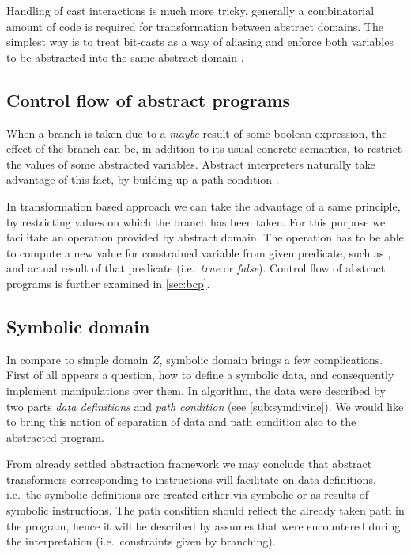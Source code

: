 Handling of cast interactions is much more tricky, generally a combinatorial
amount of code is required for transformation between abstract domains. The
simplest way is to treat bit-casts as a way of aliasing and enforce both
variables to be abstracted into the same abstract domain \cite{Rockai15}.


\subsection{Control flow of abstract programs} \label{subsec:cf}
When a branch is taken due to a \emph{maybe} result of some boolean expression,
the effect of the branch can be, in addition to its usual concrete semantics,
to restrict the values of some abstracted variables. Abstract interpreters
naturally take advantage of this fact, by building up a path condition
\cite{Rockai15}.

In transformation based approach we can take the advantage of a same principle, by
restricting values on which the branch has been taken. For this purpose we
facilitate an  operation provided by abstract domain. The
 operation has to be able to compute a new value for constrained
variable from given \LLVM predicate, such as , and actual result of
that predicate (i.e.~\emph{true} or \emph{false}). Control flow of abstract
programs is further examined in \autoref{sec:bcp}.

\subsection{Symbolic domain}\label{sec:sym}

In compare to simple domain $Z$, symbolic domain brings a few complications.
First of all appears a question, how to define a symbolic data, and consequently
implement manipulations over them. In \SymDIVINE algorithm, the data were
described by two parts \emph{data definitions} and \emph{path condition} (see
\autoref{sub:symdivine}). We would like to bring this notion of separation of data
and path condition also to the abstracted program.

From already settled abstraction framework we may conclude that abstract
transformers corresponding to \LLVM instructions will facilitate on data
definitions, i.e.~the symbolic definitions are created either via symbolic
 or as results of symbolic instructions. The path condition should
reflect the already taken path in the program, hence it will be described by
assumes that were encountered during the interpretation (i.e.~constraints given
by branching).

